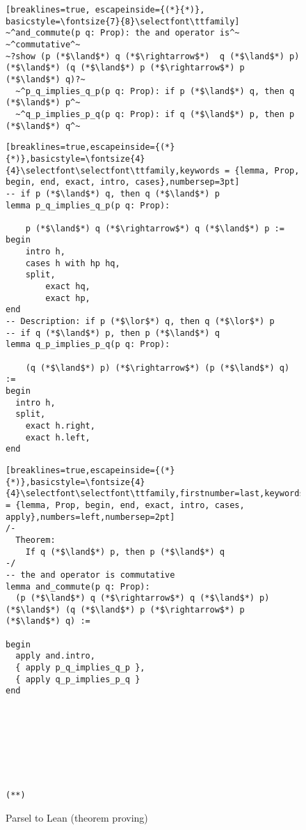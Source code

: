 \begin{figure}
\begin{minipage}{\textwidth}
\begin{minipage}{0.44\textwidth}
\centering
\begin{lstlisting}[breaklines=true, escapeinside={(*}{*)}, basicstyle=\fontsize{7}{8}\selectfont\ttfamily]
~^and_commute(p q: Prop): the and operator is^~ ~^commutative^~
~?show (p (*$\land$*) q (*$\rightarrow$*)  q (*$\land$*) p) (*$\land$*) (q (*$\land$*) p (*$\rightarrow$*) p (*$\land$*) q)?~
  ~^p_q_implies_q_p(p q: Prop): if p (*$\land$*) q, then q (*$\land$*) p^~
  ~^q_p_implies_p_q(p q: Prop): if q (*$\land$*) p, then p (*$\land$*) q^~
\end{lstlisting}
\end{minipage}\hfill \hspace{1px}{\Large $\Rightarrow$}\hspace{2px} \hfill
\begin{minipage}{0.24\textwidth}
\begin{lstlisting}[breaklines=true,escapeinside={(*}{*)},basicstyle=\fontsize{4}{4}\selectfont\selectfont\ttfamily,keywords = {lemma, Prop, begin, end, exact, intro, cases},numbersep=3pt]
-- if p (*$\land$*) q, then q (*$\land$*) p
lemma p_q_implies_q_p(p q: Prop):

    p (*$\land$*) q (*$\rightarrow$*) q (*$\land$*) p :=
begin
    intro h,
    cases h with hp hq,
    split,
        exact hq,
        exact hp,
end
-- Description: if p (*$\lor$*) q, then q (*$\lor$*) p
-- if q (*$\land$*) p, then p (*$\land$*) q
lemma q_p_implies_p_q(p q: Prop):

    (q (*$\land$*) p) (*$\rightarrow$*) (p (*$\land$*) q) :=
begin
  intro h,
  split,
    exact h.right,
    exact h.left,
end
\end{lstlisting}
\end{minipage}\hspace{0.015\textwidth}
\begin{minipage}{0.24\textwidth}
\centering
\begin{lstlisting}[breaklines=true,escapeinside={(*}{*)},basicstyle=\fontsize{4}{4}\selectfont\selectfont\ttfamily,firstnumber=last,keywords = {lemma, Prop, begin, end, exact, intro, cases, apply},numbers=left,numbersep=2pt]
/-
  Theorem:
    If q (*$\land$*) p, then p (*$\land$*) q
-/
-- the and operator is commutative
lemma and_commute(p q: Prop):
  (p (*$\land$*) q (*$\rightarrow$*) q (*$\land$*) p) (*$\land$*) (q (*$\land$*) p (*$\rightarrow$*) p (*$\land$*) q) :=

begin
  apply and.intro,
  { apply p_q_implies_q_p },
  { apply q_p_implies_p_q }
end








(**)
\end{lstlisting}
\end{minipage}
\vspace{-10px}
\caption{Parsel to Lean (theorem proving)}
\label{leanandexample}
\vspace{1px}
\end{minipage} \end{figure}

